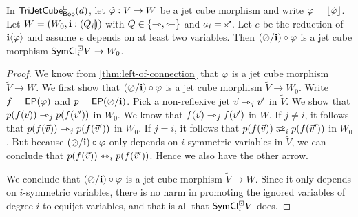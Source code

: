 \documentclass[a4paper]{memoir}
\begin{document}
\begin{corollary} \label{thm:weaken-connection}
	In $\mathsf{TriJetCube}^{\Box}_{\mathsf{Boo}}\mathopen{}\left( \vec a \right)\mathclose{}$, let $\hat {\varphi} : V \to W$ be a jet cube morphism and write $\varphi = \mathopen{}\left\lfloor \hat {\varphi} \right\rfloor\mathclose{}$.
	Let $W = (W_0, \mathbf{i} : {\llparenthesis Q_i \rrparenthesis})$ with $Q \in \mathopen{}\left\{ \rightarrowtriangle, \leftarrowtriangle \right\}\mathclose{}$ and $a_i = \ypolar$.
	Let $e$ be the reduction of $\mathbf{i} \langle \varphi \rangle$ and assume $e$ depends on at least two variables.
	Then $(\oslash/\mathbf{i}) \circ \varphi$ is a jet cube morphism $\mathsf{SymCl}^\boxdot_i V \to W_0$.
\end{corollary}
\begin{proof}
	We know from \cref{thm:left-of-connection} that $\varphi$ is a jet cube morphism $\tilde V \to W$.
	We first show that $(\oslash / \mathbf{i}) \circ \varphi$ is a jet cube morphism $\tilde V \to W_0$.
	Write $f = \mathsf{EP}(\varphi)$ and $p = \mathsf{EP}(\oslash / \mathbf{i})$.
	Pick a non-reflexive jet $\vec v \rightarrowtriangle_j \vec v'$ in $\tilde{V}$.
	We show that $p(f(\vec v)) \rightarrowtriangle_j p(f(\vec v'))$ in $W_0$.
	We know that $f(\vec v) \rightarrowtriangle_j f(\vec v')$ in $W$.
	If $j \neq i$, it follows that $p(f(\vec v)) \rightarrowtriangle_j p(f(\vec v'))$ in $W_0$.
	If $j = i$, it follows that $p(f(\vec v)) \infrajet_i p(f(\vec v'))$ in $W_0$.
	But because $(\oslash/\mathbf{i}) \circ \varphi$ only depends on $i$-symmetric variables in $\tilde{V}$, we can conclude that $p(f(\vec v)) \leftrightarrowtriangle_i p(f(\vec v'))$.
	Hence we also have the other arrow.
	
	We conclude that $(\oslash/\mathbf{i}) \circ \varphi$ is a jet cube morphism $\tilde V \to W$.
	Since it only depends on $i$-symmetric variables, there is no harm in promoting the ignored variables of degree $i$ to equijet variables, and that is all that $\mathsf{SymCl}^\boxdot_i V$ does.
\end{proof}
\end{document}
